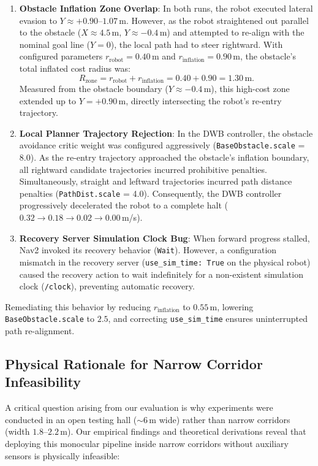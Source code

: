 \documentclass[preprint,12pt]{elsarticle}
\begin{document}
\begin{enumerate}
  \item \textbf{Obstacle Inflation Zone Overlap}: In both runs, the robot executed lateral evasion to $Y \approx +0.90\text{--}1.07$\,m. However, as the robot straightened out parallel to the obstacle ($X \approx 4.5$\,m, $Y \approx -0.4$\,m) and attempted to re-align with the nominal goal line ($Y=0$), the local path had to steer rightward. With configured parameters $r_{\mathrm{robot}} = 0.40$\,m and $r_{\mathrm{inflation}} = 0.90$\,m, the obstacle's total inflated cost radius was:
  \begin{equation}
    R_{\mathrm{zone}} = r_{\mathrm{robot}} + r_{\mathrm{inflation}} = 0.40 + 0.90 = 1.30\,\text{m}.
  \end{equation}
  Measured from the obstacle boundary ($Y \approx -0.4$\,m), this high-cost zone extended up to $Y = +0.90$\,m, directly intersecting the robot's re-entry trajectory.
  \item \textbf{Local Planner Trajectory Rejection}: In the DWB controller, the obstacle avoidance critic weight was configured aggressively (\texttt{Base}\allowbreak\texttt{Obstacle.scale} = 8.0). As the re-entry trajectory approached the obstacle's inflation boundary, all rightward candidate trajectories incurred prohibitive penalties. Simultaneously, straight and leftward trajectories incurred path distance penalties (\texttt{PathDist.scale} = 4.0). Consequently, the DWB controller progressively decelerated the robot to a complete halt ($0.32 \rightarrow 0.18 \rightarrow 0.02 \rightarrow 0.00$\,m/s).
  \item \textbf{Recovery Server Simulation Clock Bug}: When forward progress stalled, Nav2 invoked its recovery behavior (\texttt{Wait}). However, a configuration mismatch in the recovery server (\texttt{use\_sim\_time: True} on the physical robot) caused the recovery action to wait indefinitely for a non-existent simulation clock (\texttt{/clock}), preventing automatic recovery.
\end{enumerate}
Remediating this behavior by reducing $r_{\mathrm{inflation}}$ to $0.55$\,m, lowering \texttt{Base}\allowbreak\texttt{Obstacle.scale} to $2.5$, and correcting \texttt{use\_sim\_time} ensures uninterrupted path re-alignment.

\subsection{Physical Rationale for Narrow Corridor Infeasibility}
\label{subsec:corridor_limitations}
A critical question arising from our evaluation is why experiments were conducted in an open testing hall ($\sim 6$\,m wide) rather than narrow corridors (width $1.8\text{--}2.2$\,m). Our empirical findings and theoretical derivations reveal that deploying this monocular pipeline inside narrow corridors without auxiliary sensors is physically infeasible:
\end{document}
